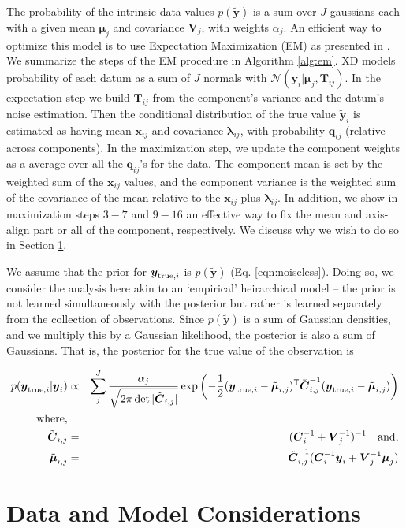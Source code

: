 \documentclass[12pt,preprint]{aastex}
\newcommand{\datavector}[1]{\boldsymbol{#1}}
\newcommand{\data}{\datavector{y}}
\newcommand{\datum}{\data_i}
\newcommand{\truedatum}{\data_{{\rm true}, i}}
\newcommand{\noiselessdata}{\tilde{\data}}
\newcommand{\xij}{\datavector{x}_{ij}}
\newcommand{\Lij}{\datavector{\lambda}_{ij}}
\newcommand{\Tij}{\datavector{T}_{ij}}
\newcommand{\qij}{\datavector{q}_{ij}}
\newcommand{\xdcov}{\datavector{V}_j}
\newcommand{\datacov}{\datavector{C}}
\newcommand{\postcov}{\tilde{\datacov}_{i, j}}
\newcommand{\xdmu}{\datavector{\mu}}
\newcommand{\postmu}{\tilde{\xdmu}_{i, j}}
\newcommand{\datumcov}{\datacov_i}
\newcommand{\transpose}{\mathsf{T}}
\begin{document}
\noindent The probability of the intrinsic data values $p(\noiselessdata)$ is
a sum over $J$ gaussians each with a given mean $\xdmu_j$ and covariance
$\xdcov$, with weights $\alpha_j$.  An efficient way
to optimize this model is to use Expectation Maximization (EM) as presented in
\citep{bovy11}.  We summarize the steps of the EM procedure in Algorithm
\ref{alg:em}.  XD models probability of each datum as a
sum of $J$ normals with $\mathcal{N}(\datum | \xdmu_j, \Tij)$.  In the
expectation step we build $\Tij$ from the component's variance and the datum's
noise estimation.  Then the conditional distribution of the true value
$\noiselessdata_i$ is estimated as having mean $\xij$ and covariance
$\Lij$, with probability $\qij$ (relative across components).  In the
maximization step, we update the component weights as a average over all
the $\qij$'s for the data.  The component mean is set by the weighted sum of 
the $\xij$ values, and the component variance is the weighted sum of the 
covariance of the mean relative to the $\xij$ plus $\Lij$.  In addition, we
show in maximization steps $3-7$ and $9-16$ an effective way to fix the mean
and axis-align part or all of the component, respectively.  We discuss why we
wish to do so in Section \ref{sec:data}.

We assume that the prior for $\truedatum$ is $p(\noiselessdata)$
(Eq. \ref{eqn:noiseless}).  Doing so, we consider the analysis here akin to an 
`empirical' heirarchical model -- the prior is not learned simultaneously with
the posterior but rather is learned separately from the collection of
observations. Since $p(\noiselessdata)$ is a sum of Gaussian densities, and
we multiply this by a Gaussian likelihood, the posterior is also a sum of
Gaussians.  That is, the posterior for the true value of the observation is

\begin{eqnarray}\displaystyle
p(\truedatum | \datum) & \propto & \sum_j^J \frac{\alpha_j}{\sqrt{2\pi\det{|\postcov|}}} \exp \left (-\frac{1}{2}(\truedatum - \postmu)^\transpose \postcov^{-1}(\truedatum - \postmu) \right ) \\
{\rm where,}\\
\postcov & = & (\datumcov^{-1} + \xdcov^{-1})^{-1} \quad {\rm and,} \\
\postmu & = &  \postcov^{-1} (\datumcov^{-1} \datum + \xdcov^{-1} \xdmu_j)
\label{eqn:posterior}
\end{eqnarray}

\section{Data and Model Considerations}
\label{sec:data}
\end{document}

